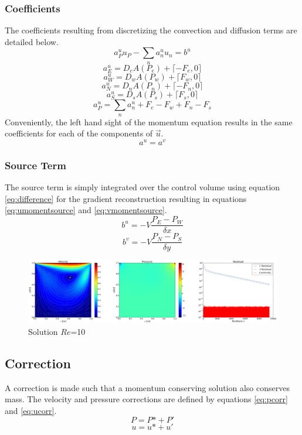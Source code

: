 \documentclass[12pt,twocolumn]{article}
\newcommand{\st}[0]{\text{*}}
\begin{document}
\subsubsection*{Coefficients}

The coefficients resulting from discretizing the convection and diffusion terms are detailed below.
\begin{equation}\label{eq:diffconvcoeff}a_P^u u_P - \sum\limits_na_n^u u_n= b^u \end{equation}
\[a_E^u = D_eA(P_e) + \lceil -F_e, 0 \rceil\]
\[a_W^u = D_wA(P_w) + \lceil F_w, 0 \rceil\]
\[a_N^u = D_nA(P_n) + \lceil -F_n, 0 \rceil\]
\[a_S^u = D_sA(P_s) + \lceil F_s, 0 \rceil\]
\[a_P^u = \sum\limits_n a_n^u + F_e - F_w + F_n - F_s\]
Conveniently, the left hand sight of the momentum equation results in the same coefficients for each of the components of $\vec u$.
\[a^u = a^v\]

\subsubsection*{Source Term}
The source term is simply integrated over the control volume using equation \eqref{eq:difference} for the gradient reconstruction resulting in equations \eqref{eq:umomentsource} and \eqref{eq:vmomentsource}.
\begin{equation}\label{eq:umomentsource}b^u = -V \frac{P_E-P_W}{\delta x}\end{equation}
\begin{equation}\label{eq:vmomentsource}b^v = -V \frac{P_N-P_S}{\delta y}\end{equation}

\begin{figure}
\includegraphics[width=\textwidth]{plot/solution10.png}
\footnotesize{\caption{Solution $Re$=10}\label{fig:solution10}}
\end{figure}
\subsection*{Correction}

A correction is made such that a momentum conserving solution also conserves mass.
The velocity and pressure corrections are defined by equations \eqref{eq:pcorr} and \eqref{eq:ucorr}.
\begin{equation}\label{eq:pcorr}P = P\st + P'\end{equation}
\begin{equation}\label{eq:ucorr}u = u\st + u'\end{equation}
\end{document}
